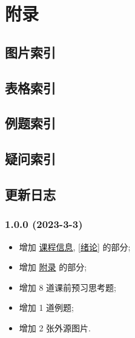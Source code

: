 \section{附录} \label{附录}
\subsection{图片索引} \label{图片索引}
\makeatletter
{}
\makeatother

\subsection{表格索引} \label{表格索引}
\makeatletter
{}
\makeatother

\subsection{例题索引} \label{例题索引}
\listofexampleprobs

\subsection{疑问索引} \label{疑问索引}
\listofquestions

\subsection{更新日志} \label{更新日志}
\subsubsection*{1.0.0 (2023-3-3)}
\begin{itemize}
    \item 增加 \hyperref[课程信息]{课程信息}, \ref{绪论} 的部分;
    \item 增加 \hyperref[附录]{附录} 的部分;
    \item 增加 8 道课前预习思考题;
    \item 增加 1 道例题;
    \item 增加 2 张外源图片.
\end{itemize}
